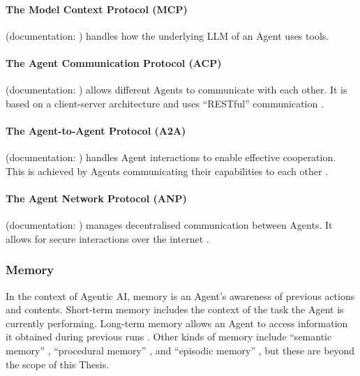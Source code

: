 \documentclass[
	fontsize = 11pt,
	paper = a4,
	draft = false,
	twoside = true,
	titlepage = false
]{scrartcl}
\numberwithin{equation}{subsection}
\begin{document}
	\paragraph{The Model Context Protocol (MCP)} \autocite{orchFrameworks} (documentation: \autocite{MCP}) handles how the underlying \gls{LLM} of an \gls{Agent} uses tools.
	
	\paragraph{The Agent Communication Protocol (ACP)} \autocite{orchFrameworks} (documentation: \autocite{ACP}) allows different \glspl{Agent} to communicate with each other. It is based on a client-server architecture and uses \enquote{RESTful} communication \autocite{protocols}.
	
	\paragraph{The Agent-to-Agent Protocol (A2A)} \autocite{orchFrameworks} (documentation: \autocite{A2A}) handles \gls{Agent} interactions to enable effective cooperation. This is achieved by \glspl{Agent} communicating their capabilities to each other \autocite{protocols}.
	
	\paragraph{The Agent Network Protocol (ANP)} \autocite{orchFrameworks} (documentation: \autocite{ANP}) manages decentralised communication between \glspl{Agent}. It allows for secure interactions over the internet \autocite{protocols}.
	
	\subsubsection{Memory} \label{subsub:memory}
	In the context of \gls{Agentic AI}, memory is an \gls{Agent}'s awareness of previous actions and contents. Short-term memory includes the context of the task the \gls{Agent} is currently performing. Long-term memory allows an \gls{Agent} to access information it obtained during previous runs \autocite{orchFrameworks}. Other kinds of memory include \enquote{semantic memory} \autocite{orchFrameworks}, \enquote{procedural memory} \autocite{orchFrameworks}, and \enquote{episodic memory} \autocite{orchFrameworks}, but these are beyond the scope of this Thesis.
	
\end{document}
